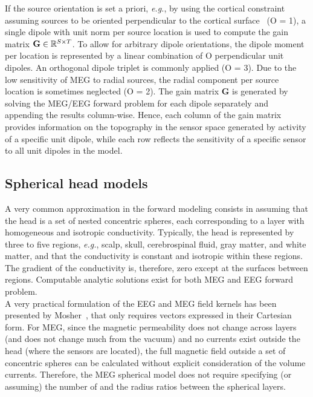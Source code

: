 If the source orientation is set a priori, \textit{e.g.}, by using the cortical constraint assuming sources to be oriented perpendicular to the cortical surface~\cite{Dale:1993} (O = 1), a single dipole with unit norm per source location is used to compute the gain matrix $\mathbf{G}\in\mathbb{R}^{S\times T}$. To allow for arbitrary dipole orientations, the dipole moment per location is represented by a linear combination of O perpendicular unit dipoles. An orthogonal dipole triplet is commonly applied (O = 3). Due to the low sensitivity of MEG to radial sources, the radial component per source location is sometimes neglected (O = 2). The gain matrix $\mathbf{G}$ is generated by solving the MEG/EEG forward problem for each dipole separately and appending the results column-wise. Hence, each column of the gain matrix provides information on the topography in the sensor space generated by activity of a specific unit dipole, while each row reflects the sensitivity of a specific sensor to all unit dipoles in the model.

\subsection*{Spherical head models}
A very common approximation in the forward modeling consists in assuming that the head is a set of nested concentric spheres, each corresponding to a layer with homogeneous and isotropic conductivity. Typically, the head is represented by three to five regions, \textit{e.g.}, scalp, skull, cerebrospinal fluid, gray matter, and white matter, and that the conductivity is constant and isotropic within these regions. The gradient of the conductivity is, therefore, zero except at the surfaces between regions. Computable analytic solutions exist for both MEG and EEG forward problem.\\

A very practical formulation of the EEG and MEG field kernels has been presented by Mosher~\cite{mosher1999eeg}, that only requires vectors expressed in their Cartesian form. For MEG, since the magnetic permeability does not change across layers (and does not change much from the vacuum) and no currents exist outside the head (where the sensors are located), the full magnetic field outside a set of concentric spheres can be calculated without explicit consideration of the volume currents. Therefore, the MEG spherical model does not require specifying (or assuming) the number of and the radius ratios between the spherical layers.\\

